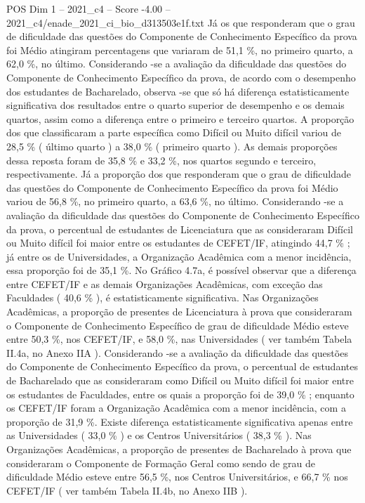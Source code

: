 \begin{textsample}{POS Dim 1 – 2021\_c4 – Score -4.00 – 2021\_c4/enade\_2021\_ci\_bio\_d313503e1f.txt}
Já os que responderam que o grau de dificuldade das questões do Componente de Conhecimento Específico da prova foi Médio atingiram percentagens que variaram de 51,1 \%, no primeiro quarto, a 62,0 \%, no último.
Considerando -se a avaliação da dificuldade das questões do Componente de Conhecimento Específico da prova, de acordo com o desempenho dos estudantes de Bacharelado, observa -se que só há diferença estatisticamente significativa dos resultados entre o quarto superior de desempenho e os demais quartos, assim como a diferença entre o primeiro e terceiro quartos.
A proporção dos que classificaram a parte específica como Difícil ou Muito difícil variou de 28,5 \% ( último quarto ) a 38,0 \% ( primeiro quarto ).
As demais proporções dessa reposta foram de 35,8 \% e 33,2 \%, nos quartos segundo e terceiro, respectivamente.
Já a proporção dos que responderam que o grau de dificuldade das questões do Componente de Conhecimento Específico da prova foi Médio variou de 56,8 \%, no primeiro quarto, a 63,6 \%, no último.
Considerando -se a avaliação da dificuldade das questões do Componente de Conhecimento Específico da prova, o percentual de estudantes de Licenciatura que as consideraram Difícil ou Muito difícil foi maior entre os estudantes de CEFET/IF, atingindo 44,7 \% ; já entre os de Universidades, a Organização Acadêmica com a menor incidência, essa proporção foi de 35,1 \%.
No Gráfico 4.7a, é possível observar que a diferença entre CEFET/IF e as demais Organizações Acadêmicas, com exceção das Faculdades ( 40,6 \% ), é estatisticamente significativa.
Nas Organizações Acadêmicas, a proporção de presentes de Licenciatura à prova que consideraram o Componente de Conhecimento Específico de grau de dificuldade Médio esteve entre 50,3 \%, nos CEFET/IF, e 58,0 \%, nas Universidades ( ver também Tabela II.4a, no Anexo IIA ).
Considerando -se a avaliação da dificuldade das questões do Componente de Conhecimento Específico da prova, o percentual de estudantes de Bacharelado que as consideraram como Difícil ou Muito difícil foi maior entre os estudantes de Faculdades, entre os quais a proporção foi de 39,0 \% ; enquanto os CEFET/IF foram a Organização Acadêmica com a menor incidência, com a proporção de 31,9 \%.
Existe diferença estatisticamente significativa apenas entre as Universidades ( 33,0 \% ) e os Centros Universitários ( 38,3 \% ).
Nas Organizações Acadêmicas, a proporção de presentes de Bacharelado à prova que consideraram o Componente de Formação Geral como sendo de grau de dificuldade Médio esteve entre 56,5 \%, nos Centros Universitários, e 66,7 \% nos CEFET/IF ( ver também Tabela II.4b, no Anexo IIB ).

\end{textsample}
